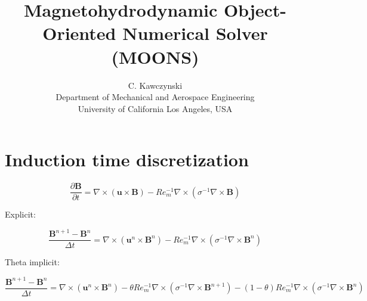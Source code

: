 \documentclass[11pt]{article}
\begin{document}
\doublespacing
\title{Magnetohydrodynamic Object-Oriented Numerical Solver (MOONS)}
\author{C. Kawczynski \\
Department of Mechanical and Aerospace Engineering \\
University of California Los Angeles, USA\\
}

\section{Induction time discretization}

\begin{equation}
	\frac{\partial \mathbf{B}}{\partial t}
	=
	\nabla \times (\mathbf{u} \times \mathbf{B}) - 
	Re_m^{-1} \nabla \times (\sigma^{-1} \nabla \times \mathbf{B})
\end{equation}

Explicit:

\begin{equation}
	\frac{\mathbf{B}^{n+1}-\mathbf{B}^n}{\Delta t}
	=
	\nabla \times (\mathbf{u}^n \times \mathbf{B}^n) - 
	Re_m^{-1} \nabla \times (\sigma^{-1} \nabla \times \mathbf{B}^n)
\end{equation}

Theta implicit:

\begin{equation}
	\frac{\mathbf{B}^{n+1}-\mathbf{B}^n}{\Delta t}
	=
	\nabla \times (\mathbf{u}^n \times \mathbf{B}^n) - 
	\theta
	Re_m^{-1} \nabla \times (\sigma^{-1} \nabla \times \mathbf{B}^{n+1})
	-
	(1-\theta)
	Re_m^{-1} \nabla \times (\sigma^{-1} \nabla \times \mathbf{B}^n)
\end{equation}
\end{document}
